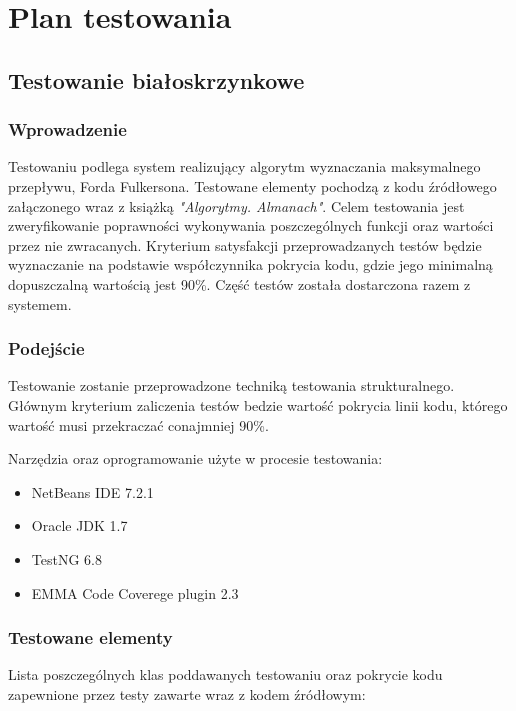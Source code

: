 \documentclass[10pt]{dokument-tiwo}
\begin{document}
\MakeDokumentMeta


\section{Plan testowania}
\subsection{Testowanie białoskrzynkowe}
\subsubsection{Wprowadzenie}
Testowaniu podlega system realizujący algorytm wyznaczania maksymalnego przepływu, Forda Fulkersona. Testowane elementy pochodzą
z kodu źródłowego załączonego wraz z książką \emph{"Algorytmy. Almanach"}. Celem testowania jest zweryfikowanie poprawności wykonywania poszczególnych
funkcji oraz wartości przez nie zwracanych. Kryterium satysfakcji przeprowadzanych testów będzie wyznaczanie na podstawie współczynnika pokrycia kodu, gdzie
jego minimalną dopuszczalną wartością jest 90\%. Część testów została dostarczona razem z systemem.

\subsubsection{Podejście}
Testowanie zostanie przeprowadzone techniką testowania strukturalnego. Głównym kryterium zaliczenia testów bedzie wartość pokrycia linii kodu, którego
wartość musi przekraczać conajmniej 90\%.

Narzędzia oraz oprogramowanie użyte w procesie testowania:
    \begin{itemize}
        \item NetBeans IDE 7.2.1
        \item Oracle JDK 1.7
        \item TestNG 6.8
        \item EMMA Code Coverege plugin 2.3
    \end{itemize}

\subsubsection{Testowane elementy}
Lista poszczególnych klas poddawanych testowaniu oraz pokrycie kodu zapewnione przez testy zawarte wraz z kodem źródłowym:
\end{document}
